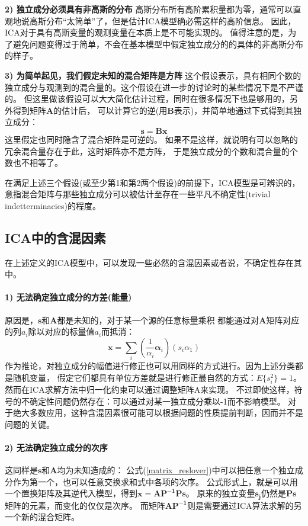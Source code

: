 \textbf{2) 独立成分必须具有非高斯的分布}
高斯分布所有高阶累积量都为零，通常可以直观地说高斯分布“太简单”了，但是估计ICA模型确必需这样的高阶信息。
因此，ICA对于具有高斯变量的观测变量在本质上是不可能实现的。
值得注意的是，为了避免问题变得过于简单，不会在基本模型中假定独立成分的的具体的非高斯分布的样子。

\textbf{3) 为简单起见，我们假定未知的混合矩阵是方阵}
这个假设表示，具有相同个数的独立成分与观测到的混合量的。这个假设在进一步的讨论时的某些情况下是不严谨的。
但这里做该假设可以大大简化估计过程，同时在很多情况下也是够用的，另外得到矩阵$\bm{A}$的估计后，
可以计算它的逆(用$\bm{B}$表示)，并简单地通过下式得到其独立成分：
\begin{equation}
\bm{s}=\bm{B}\bm{x}
\end{equation}
这里假定也同时隐含了混合矩阵是可逆的。
如果不是这样，就说明有可以忽略的冗余混合量存在于此，这时矩阵亦不是方阵，
于是独立成分的个数和混合量的个数也不相等了。

在满足上述三个假设(或至少第1和第2两个假设)的前提下，ICA模型是可辨识的，
意指混合矩阵与那些独立成分可以被估计至存在一些平凡不确定性(trivial indetterminacies)的程度。

\subsection{ICA中的含混因素}
在上述定义的ICA模型中，可以发现一些必然的含混因素或者说，不确定性存在其中。
\paragraph*{1) 无法确定独立成分的方差(能量)}
原因是，$\bm{s}$和$\bm{A}$都是未知的，对于某一个源的任意标量乘积
都能通过对$\bm{A}$矩阵对应的列$a_i$除以对应的标量值$a_i$而抵消：
\begin{equation}
\bm{x}=\sum_{i} (\frac{1}{{\alpha}_i} \bm{\alpha}_i)(s_i {\alpha}_1)
\end{equation}
作为推论，对独立成分的幅值进行修正也可以用同样的方式进行。因为上述分类都是随机变量，
假定它们都具有单位方差就是进行修正最自然的方式：$E\{s_i^2\}=1$。
然而在ICA求解方法中归一化约束可以通过调整矩阵A来实现。
不过即使这样，符号的不确定性问题仍然存在：可以通过对某一独立成分乘以-1而不影响模型。
对于绝大多数应用，这种含混因素很可能可以根据问题的性质提前判断，因而并不是问题的关键。

\paragraph*{2) 无法确定独立成分的次序}
这同样是$\bm{s}$和$\bm{A}$均为未知造成的：
公式(\ref{matrix_reslover})中可以把任意一个独立成分作为第一个，也可以任意交换求和式中各项的次序。
公式形式上，就是可以用一个置换矩阵及其逆代入模型，得到$\bm{x=AP^{-1}Ps}$。
原来的独立变量$\bm{s_j}$仍然是$\bm{Ps}$矩阵的元素，而变化的仅仅是次序。
而矩阵$\bm{AP^{-1}}$则是需要通过ICA算法求解的另一个新的混合矩阵。

